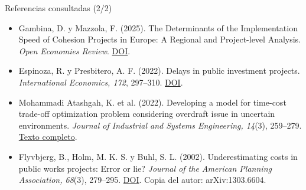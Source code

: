 \documentclass[11pt,aspectratio=169]{beamer}
\begin{document}
\begin{frame}{Referencias consultadas (2/2)}
\small
\begin{itemize}\setlength{\itemsep}{3mm}
\item Gambina, D. y Mazzola, F. (2025). The Determinants of the Implementation Speed of Cohesion Projects in Europe: A Regional and Project-level Analysis. \emph{Open Economies Review}. \href{https://doi.org/10.1007/s11079-025-09819-3}{DOI}.
\item Espinoza, R. y Presbitero, A. F. (2022). Delays in public investment projects. \emph{International Economics, 172}, 297--310. \href{https://doi.org/10.1016/j.inteco.2021.10.002}{DOI}.
\item Mohammadi Atashgah, K. et al. (2022). Developing a model for time-cost trade-off optimization problem considering overdraft issue in uncertain environments. \emph{Journal of Industrial and Systems Engineering, 14}(3), 259--279. \href{https://www.jise.ir/article_154961.html}{Texto completo}.
\item Flyvbjerg, B., Holm, M. K. S. y Buhl, S. L. (2002). Underestimating costs in public works projects: Error or lie? \emph{Journal of the American Planning Association, 68}(3), 279--295. \href{https://doi.org/10.1080/01944360208976273}{DOI}. Copia del autor: arXiv:1303.6604.
\end{itemize}
\end{frame}
\end{document}
